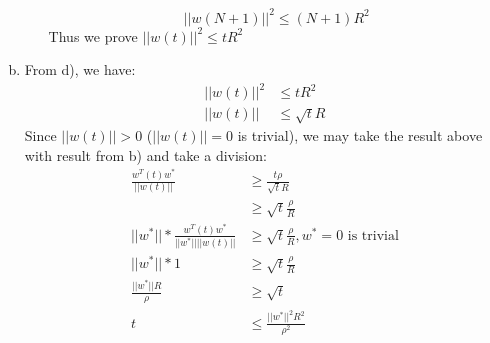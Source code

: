 \documentclass{article}
\def\math#1{$#1$}
\begin{document}
\begin{enumerate}[a)]
\begin{itemize}
            \begin{equation}
                ||w(N + 1)||^2 \leq (N + 1)R^2
            \end{equation}
            Thus we prove \math{||w(t)||^2 \leq tR^2}
        \end{itemize}
    \item From d), we have:
        \begin{equation}
            \begin{split}
                ||w(t)||^2 &\leq tR^2 \\
                ||w(t)|| &\leq \sqrt{t}R
            \end{split}
        \end{equation}
        Since \math{||w(t)|| > 0} (\math{||w(t)|| = 0} is trivial), we may take the result above with result from b) and take a division:
        \begin{equation}
            \begin{split}
                \frac{w^T(t) w^*}{||w(t)||} &\geq \frac{t\rho}{\sqrt{t}R}  \\
                &\geq \sqrt{t}\frac{\rho}{R} \\
                ||w^*|| * \frac{w^T(t) w^*}{||w^*|| ||w(t)||} &\geq \sqrt{t}\frac{\rho}{R}, w^* = 0 \text{ is trivial} \\
                ||w^*|| * 1 &\geq \sqrt{t}\frac{\rho}{R}  \\ %
                \frac{||w^*|| R}{\rho} &\geq \sqrt{t} \\
                t &\leq \frac{||w^*||^2 R^2}{\rho^2}
            \end{split}
        \end{equation}
        
\end{enumerate}
\end{document}
